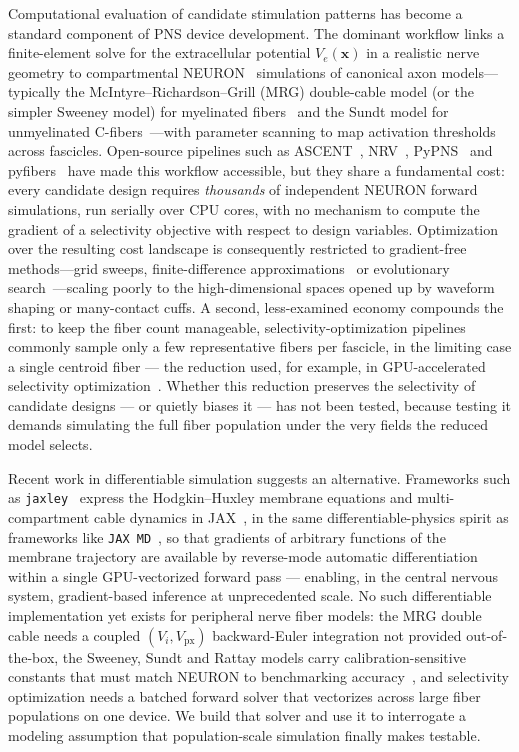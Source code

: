 Computational evaluation of candidate stimulation patterns has
become a standard component of PNS device development.  The dominant
workflow links a finite-element solve for the extracellular potential
$V_e(\mathbf{x})$ in a realistic nerve geometry to compartmental
NEURON~\cite{hines1997neuron} simulations of canonical axon models---
typically the McIntyre--Richardson--Grill (MRG) double-cable model (or
the simpler Sweeney model) for myelinated
fibers~\cite{mcintyre2002,sweeney1987} and the Sundt model for
unmyelinated C-fibers~\cite{sundt2015}---with
parameter scanning to map activation thresholds across fascicles.
Open-source pipelines such as ASCENT~\cite{musselman2021ascent},
NRV~\cite{couppey2024nrv}, PyPNS~\cite{lubba2019pypns} and
pyfibers~\cite{marshall2025pyfibers} have made this workflow accessible, but
they share a fundamental cost: every candidate design requires
\emph{thousands} of independent NEURON forward simulations, run
serially over CPU cores, with no mechanism to compute the gradient of
a selectivity objective with respect to design variables.  Optimization
over the resulting cost landscape is consequently restricted to
gradient-free methods---grid sweeps, finite-difference
approximations~\cite{marshall2025pyfibers} or evolutionary
search~\cite{aristovich2021}---scaling poorly to the high-dimensional
spaces opened up by waveform shaping or many-contact cuffs.
A second, less-examined economy compounds the first: to keep the fiber
count manageable, selectivity-optimization pipelines commonly sample
only a few representative fibers per fascicle, in the limiting case a
single centroid fiber --- the reduction used, for example, in
GPU-accelerated selectivity optimization~\cite{hussain2024axonml}.
Whether this reduction preserves the selectivity of candidate designs
--- or quietly biases it --- has not been tested, because testing it
demands simulating the full fiber population under the very fields the
reduced model selects.

Recent work in differentiable simulation suggests an alternative.
Frameworks such as \texttt{jaxley}~\cite{deistler2024} express the
Hodgkin--Huxley membrane equations and multi-compartment cable
dynamics in JAX~\cite{jax2018}, in the same differentiable-physics
spirit as frameworks like \texttt{JAX\,MD}~\cite{schoenholz2020jaxmd},
so that gradients of arbitrary
functions of the membrane trajectory are available by reverse-mode
automatic differentiation within a single GPU-vectorized forward pass
--- enabling, in the central nervous system, gradient-based inference
at unprecedented scale.  No such differentiable implementation yet
exists for peripheral nerve fiber models: the MRG double cable needs a
coupled $(V_i, V_{\mathrm{px}})$ backward-Euler integration not
provided out-of-the-box, the Sweeney, Sundt and Rattay models carry
calibration-sensitive constants that must match NEURON to benchmarking
accuracy~\cite{musselman2023}, and selectivity optimization needs a
batched forward solver that vectorizes across large fiber populations
on one device.  We build that solver and use it to interrogate a
modeling assumption that population-scale simulation finally makes
testable.

